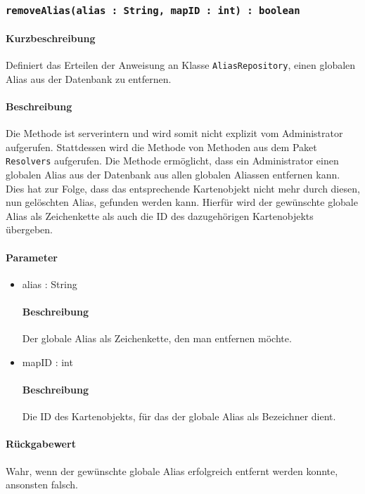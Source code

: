 \subsubsection{\texttt{removeAlias(alias : String, mapID : int) : boolean}}%
\paragraph*{Kurzbeschreibung}
Definiert das Erteilen der Anweisung an Klasse \texttt{AliasRepository}, einen globalen Alias aus der Datenbank zu entfernen.
\paragraph*{Beschreibung}
Die Methode ist serverintern und wird somit nicht explizit vom Administrator aufgerufen.
Stattdessen wird die Methode von Methoden aus dem Paket \texttt{Resolvers} aufgerufen.
Die Methode ermöglicht, dass ein Administrator einen globalen Alias aus der Datenbank aus allen globalen Aliassen entfernen kann.
Dies hat zur Folge, dass das entsprechende Kartenobjekt nicht mehr durch diesen, nun gelöschten Alias, gefunden werden kann.
Hierfür wird der gewünschte globale Alias als Zeichenkette als auch die ID des dazugehörigen Kartenobjekts übergeben.
\paragraph*{Parameter}
\begin{itemize}
    \item alias : String
    		\paragraph*{Beschreibung}
    		Der globale Alias als Zeichenkette, den man entfernen möchte.
    \item mapID : int
    		\paragraph*{Beschreibung}
    		Die ID des Kartenobjekts, für das der globale Alias als Bezeichner dient.
\end{itemize}
\paragraph*{Rückgabewert}
Wahr, wenn der gewünschte globale Alias erfolgreich entfernt werden konnte, ansonsten falsch.
